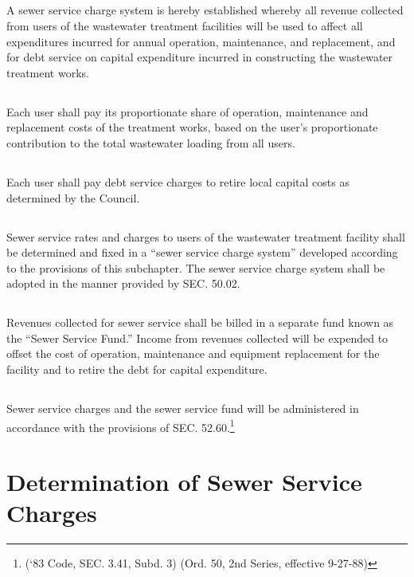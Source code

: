 \subsection{}
A sewer service charge system is hereby established whereby all revenue collected from users of the wastewater treatment facilities will be used to affect all expenditures incurred for annual operation, maintenance, and replacement, and for debt service on capital expenditure incurred in constructing the wastewater treatment works.
\subsection{}
Each user shall pay its proportionate share of operation, maintenance and replacement costs of the treatment works, based on the user’s proportionate contribution to the total wastewater loading from all users.
\subsection{}
Each user shall pay debt service charges to retire local capital costs as determined by the Council.
\subsection{}
Sewer service rates and charges to users of the wastewater treatment facility shall be determined and fixed in a “sewer service charge system” developed according to the provisions of this subchapter. The sewer service charge system shall be adopted in the manner provided by SEC. 50.02.
\subsection{}
Revenues collected for sewer service shall be billed in a separate fund known as the “Sewer Service Fund.” Income from revenues collected will be expended to offset the cost of operation, maintenance and equipment replacement for the facility and to retire the debt for capital expenditure.
\subsection{}
Sewer service charges and the sewer service fund will be administered in accordance with the provisions of SEC. 52.60.\footnote{(‘83 Code, SEC. 3.41, Subd. 3) (Ord. 50, 2nd Series, effective 9-27-88)}

\section{Determination of Sewer Service Charges}
